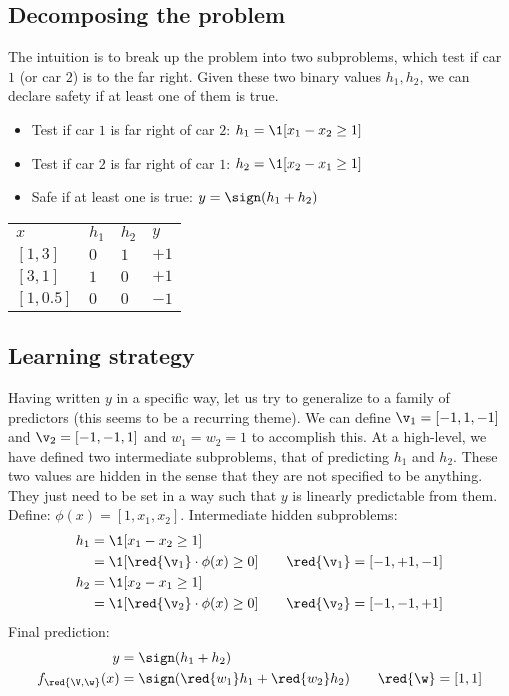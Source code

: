 \subsection{Decomposing the problem}
The intuition is to break up the problem into two subproblems,
%
which test if car $1$ (or car $2$) is to the far right.
%
Given these two binary values $h_1,h_2$, we can declare safety if at least one of them is true.
\begin{itemize}
	\item Test if car $1$ is far right of car $2$: $h_1 = \1[x_1 - x_2 \ge 1]$
	\item Test if car $2$ is far right of car $1$: $h_2 = \1[x_2 - x_1 \ge 1]$
	\item Safe if at least one is true: $y = \sign(h_1 + h_2)$
\end{itemize}
\begin{table}[!h]
\centering
\begin{tabular}{llll}
    $x$ & $h_1$ & $h_2$ & $y$\\
    $[1, 3]$ & $0$ & $1$ & $+1$\\
    $[3, 1]$ & $1$ & $0$ & $+1$\\
    $[1, 0.5]$ & $0$ & $0$ & $-1$\\
\end{tabular}
\end{table}


\subsection{Learning strategy}
Having written $y$ in a specific way, let us try to generalize to a family of predictors (this seems to be a recurring theme).
%
We can define $\v_1 = [-1, 1, -1]$ and $\v_2 = [-1, -1, 1]$ and $w_1=w_2=1$ to accomplish this.
%
At a high-level, we have defined two intermediate subproblems, that of predicting $h_1$ and $h_2$.
%
These two values are hidden in the sense that they are not specified to be anything.
%
They just need to be set in a way such that $y$ is linearly predictable from them.
Define: $\phi(x) = [1, x_1, x_2]$.
% 
Intermediate hidden subproblems:
\begin{align*}
h_1 &= \1[x_1 - x_2 \ge 1]\\
    &= \1[\red{\v_1} \cdot \phi(x) \ge 0] \qquad \red{\v_1} = [-1, +1, -1]\\
h_2 &= \1[x_2 - x_1 \ge 1]\\
    &= \1[\red{\v_2} \cdot \phi(x) \ge 0] \qquad \red{\v_2} = [-1, -1, +1]	
\end{align*}
Final prediction:
\begin{align*}
	y &= \sign(h_1 + h_2)\\
    f_{\red{\V, \w}}(x) &= \sign(\red{w_1} h_1 + \red{w_2} h_2) \qquad \red{\w} = [1, 1]
\end{align*}


